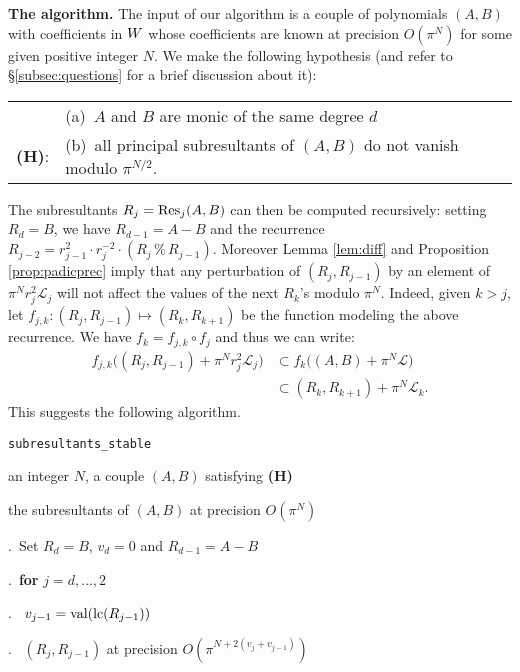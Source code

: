 \documentclass{article}
\DeclareMathOperator{\val}{val}
\begin{document}
\noindent
{\bf The algorithm.}
The input of our algorithm is a couple of polynomials $(A,B)$ with 
coefficients in $W$ whose coefficients are known at precision 
$O(\pi^N)$ for some given positive integer $N$. We make the following 
hypothesis (and refer to \S \ref{subsec:questions} for a brief 
discussion about it):

\medskip

\begin{tabular}{rl}
& (a)~$A$ and $B$ are monic of the same degree $d$ \\
{\bf (H)}: & (b)~all principal subresultants of $(A,B)$ 
do not vanish modulo $\pi^{N/2}$.
\end{tabular}

\medskip

\noindent
The subresultants $R_j = \text{\rm Res}_j(A,B)$ can then be computed recursively:
setting $R_d = B$, we have $R_{d-1} = A-B$ and the recurrence
$R_{j-2} = r_{j-1}^2 \cdot r_j^{-2} \cdot (R_j \,\%\, R_{j-1})$.
Moreover Lemma \ref{lem:diff} and Proposition \ref{prop:padicprec} imply
that any perturbation of $(R_j, R_{j-1})$ by an element of $\pi^N r_j^2 
\mathcal L_j$ will not affect the values of the next $R_k$'s modulo 
$\pi^N$. Indeed, given $k > j$, let $f_{j,k} : (R_j, R_{j-1}) \mapsto 
(R_k, R_{k+1})$ be the function modeling the above recurrence. We have
$f_k = f_{j,k} \circ f_j$ and thus we can write:
\begin{align*}
f_{j,k}\big((R_j, R_{j-1}) + \pi^N r_j^2 \mathcal L_j\big) 
& \subset f_k\big((A,B) + \pi^N \mathcal L\big) \\
& \subset (R_k, R_{k+1}) + \pi^N \mathcal L_k.
\end{align*}
This suggests the following algorithm.

\noindent\hrulefill

 {\tt subresultants\_stable}

 an integer $N$, a couple $(A,B)$ satisfying {\bf (H)}

 the subresultants of $(A,B)$ at precision $O(\pi^N)$

\smallskip{}.\ Set $R_d = B$, $v_d = 0$ and $R_{d-1} = A-B$

\smallskip{}.\ {\bf for} $j=d,\dots,2$

\smallskip{}.\ \hspace{0.3cm}{\bf compute} $v_{j-1} = \val(\lc(R_{j-1}))$

\smallskip{}.\ \hspace{0.3cm}{\bf lift} $(R_j, R_{j-1})$ at precision $O(\pi^{N+2(v_j + v_{j-1})})$
\end{document}
